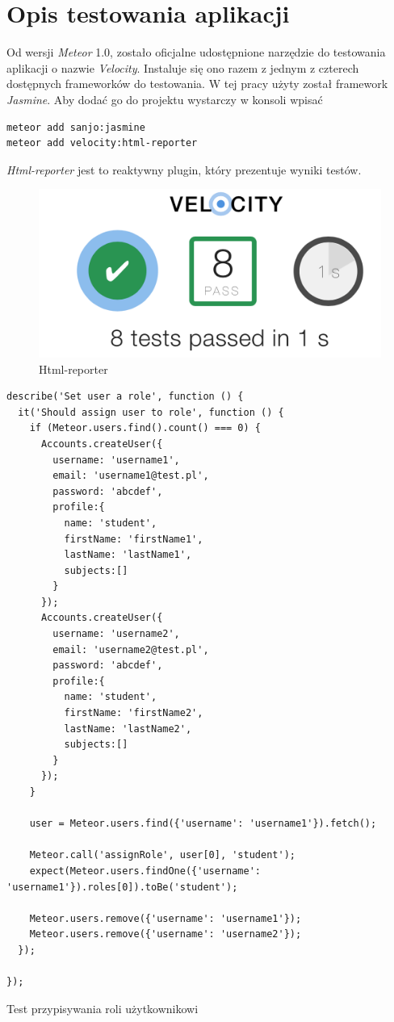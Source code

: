 \documentclass{xmgr}
\begin{document}
\cite{Introduction}
\cite{MeteorDocs}
\cite{MongoDocs}
\cite{ScalingMongoDB2011}
\cite{ScalingWithMongoDB}
\section{Opis testowania aplikacji}
\indent \indent \indent Od wersji \textit{Meteor} 1.0, zostało oficjalne udostępnione narzędzie do testowania aplikacji o nazwie \textit{Velocity}. Instaluje się ono razem z jednym z czterech dostępnych frameworków do testowania. W tej pracy użyty został framework \textit{Jasmine}. Aby dodać go do projektu wystarczy w konsoli wpisać

\begin{lstlisting}[language=bash,caption={Instalacja Velocity, Jasmine i html reporter}]
meteor add sanjo:jasmine
meteor add velocity:html-reporter
\end{lstlisting}

\noindent \textit{Html-reporter} jest to reaktywny plugin, który prezentuje wyniki testów.

\begin{figure}[H]
\centering
\includegraphics[width=0.7\hsize]{images/htmlReporter}
\caption{Html-reporter\label{RYS.18}}
\end{figure}

\begin{listing}[H]
\begin{verbatim}
describe('Set user a role', function () {
  it('Should assign user to role', function () {
    if (Meteor.users.find().count() === 0) {
      Accounts.createUser({
        username: 'username1',
        email: 'username1@test.pl',
        password: 'abcdef',
        profile:{
          name: 'student',
          firstName: 'firstName1',
          lastName: 'lastName1',
          subjects:[]
        }
      });
      Accounts.createUser({
        username: 'username2',
        email: 'username2@test.pl',
        password: 'abcdef',
        profile:{
          name: 'student',
          firstName: 'firstName2',
          lastName: 'lastName2',
          subjects:[]
        }
      });
    }

    user = Meteor.users.find({'username': 'username1'}).fetch();

    Meteor.call('assignRole', user[0], 'student');
    expect(Meteor.users.findOne({'username': 'username1'}).roles[0]).toBe('student');

    Meteor.users.remove({'username': 'username1'});
    Meteor.users.remove({'username': 'username2'});
  });

});
\end{verbatim}
\caption{Test przypisywania roli użytkownikowi}
\end{listing}
\end{document}
